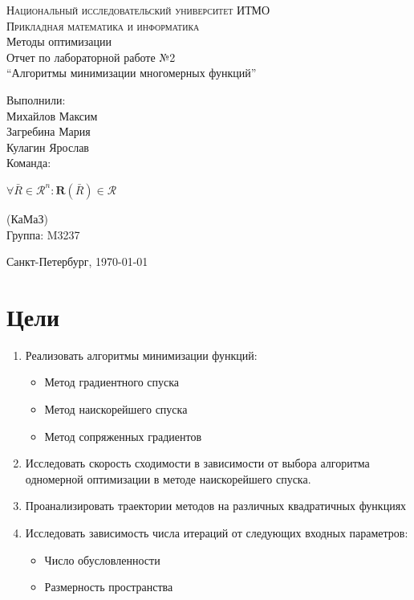 


	
	\begin{titlepage}
		\begin{center}
			\textsc{Национальный исследовательский университет ИТМО\\
				Прикладная математика и информатика}\\[5cm]
			
			\huge{Методы оптимизации\\[6mm]
				\large Отчет по лабораторной работе №2\\
				``Алгоритмы минимизации многомерных функций''\\[4cm]
				
			}
		\end{center}
		
		\begin{flushright}
			\begin{minipage}{0.25\textwidth}
				Выполнили:\\[2mm]
				Михайлов Максим\\
				Загребина Мария\\
				Кулагин Ярослав\\[2mm]
				Команда:
				
				\(\forall \bar R \in \mathscr{R}^n : \mathrm{\textbf{R}}(\bar R) \in \mathscr{R}\)
				
				(КаМаЗ)\\[2mm]
				Группа: M3237
			\end{minipage}
		\end{flushright}
		
		\vfill
		\begin{center}
			Санкт-Петербург, \today
		\end{center}
	\end{titlepage}
	
	
	
	\section{Цели}
	\begin{enumerate}
		\item Реализовать алгоритмы минимизации функций:
		\begin{itemize}
			\item Метод градиентного спуска
			\item Метод наискорейшего спуска
			\item Метод сопряженных градиентов
		\end{itemize}
		\item Исследовать скорость сходимости в зависимости от выбора алгоритма одномерной оптимизации в методе наискорейшего спуска.
		\item Проанализировать траектории методов на различных квадратичных функциях
		\item Исследовать зависимость числа итераций от следующих входных параметров:
		\begin{itemize}
			\item Число обусловленности
			\item Размерность пространства
		\end{itemize}
	\end{enumerate}
	
